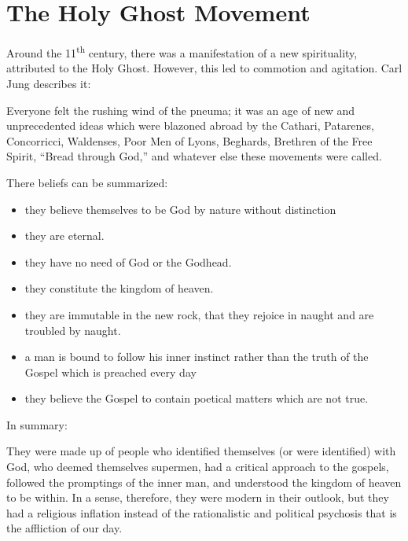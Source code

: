 \section{The Holy Ghost Movement}

Around the 11\textsuperscript{th} century, there was a manifestation of a new spirituality, attributed to the Holy Ghost. However, this led to commotion and agitation. Carl Jung describes it:

\begin{quotex}
Everyone felt the rushing wind of the pneuma; it was an age of new and unprecedented ideas which were blazoned abroad by the Cathari, Patarenes, Concorricci, Waldenses, Poor Men of Lyons, Beghards, Brethren of the Free Spirit, ``Bread through God,'' and whatever else these movements were called.
\end{quotex}


There beliefs can be summarized:

\begin{itemize}


\item they believe themselves to be God by nature without distinction

\item they are eternal.

\item they have no need of God or the Godhead.

\item they constitute the kingdom of heaven.

\item they are immutable in the new rock, that they rejoice in naught and are troubled by naught.

\item a man is bound to follow his inner instinct rather than the truth of the Gospel which is preached every day

\item they believe the Gospel to contain poetical matters which are not true.
\end{itemize}


In summary:

\begin{quotex}
They were made up of people who identified themselves (or were identified) with God, who deemed themselves supermen, had a critical approach to the gospels, followed the promptings of the inner man, and understood the kingdom of heaven to be within. In a sense, therefore, they were modern in their outlook, but they had a religious inflation instead of the rationalistic and political psychosis that is the affliction of our day.
\end{quotex}


